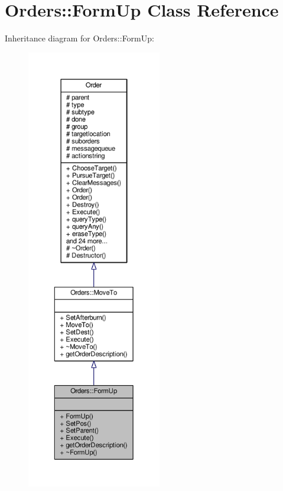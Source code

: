 \hypertarget{classOrders_1_1FormUp}{}\section{Orders\+:\+:Form\+Up Class Reference}
\label{classOrders_1_1FormUp}


Inheritance diagram for Orders\+:\+:Form\+Up\+:
\nopagebreak
\begin{figure}[H]
\begin{center}
\leavevmode
\includegraphics[height=550pt]{de/d48/classOrders_1_1FormUp__inherit__graph}
\end{center}
\end{figure}


